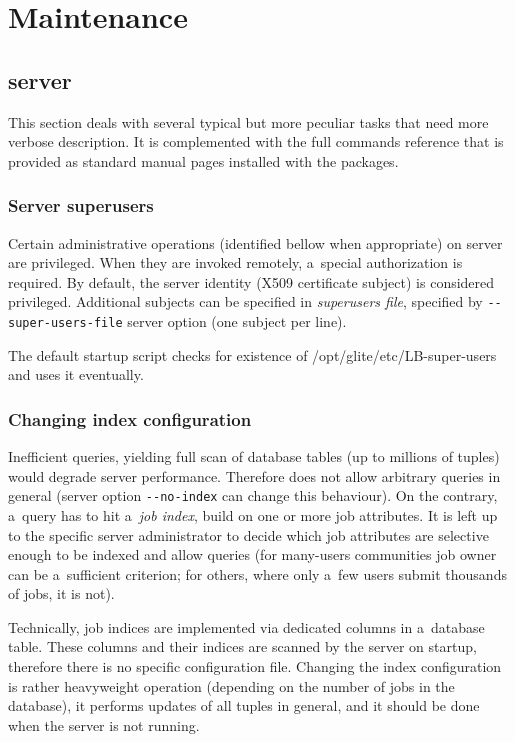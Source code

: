 \section{Maintenance}

\subsection{\LB server}

This section deals with several typical but more peculiar tasks
that need more verbose description.
It is complemented with the full commands reference that is provided
as standard manual pages installed with the \LB packages.

\subsubsection{Server superusers}

Certain administrative operations (identified bellow when appropriate)
on \LB server are privileged.
When they are invoked remotely, a~special authorization is required.
By default, the server identity (X509 certificate subject) is considered
privileged.
Additional subjects can be specified in \emph{superusers file},
specified by \verb'--super-users-file' server option
(one subject per line).

The default startup script checks for existence of 
/opt/glite/etc/LB-super-users and uses it eventually.

\subsubsection{Changing index configuration}

Inefficient queries, yielding full scan of \LB database tables (up to millions of tuples) would degrade server performance.
Therefore \LB does not allow arbitrary queries in general
(server option \verb'--no-index' can change this behaviour).
On the contrary, a~query has to hit a~\emph{job index}, build on one or
more job attributes.
It is left up to the specific \LB server administrator to decide
which job attributes are selective enough to be indexed and allow queries
(\eg for many-users communities job owner can be a~sufficient criterion;
for others, where only a~few users submit thousands of jobs, it is not).

Technically, job indices are implemented via dedicated columns
in a~database table.
These columns and their indices are scanned by the \LB server on startup,
therefore there is no specific configuration file.
Changing the index configuration is rather heavyweight operation
(depending on the number of jobs in the database), it performs
updates of all tuples in general, and it should be done when the server is not
running.

